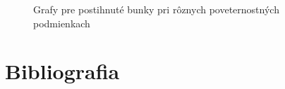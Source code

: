 \documentclass[a4paper,12pt]{article}
\begin{document}
\FloatBarrier
\begin{figure}%
    \centering
    \qquad
    \caption{Grafy pre postihnuté bunky pri rôznych poveternostných podmienkach}

    \label{fig:affected}
\end{figure}
\FloatBarrier

\newpage
\section{Bibliografia}


\nocite{CAmodel4FF}
\nocite{Pnoise}
\nocite{simulations}
\nocite{fireSpread}
\nocite{konceptModel}
\end{document}
